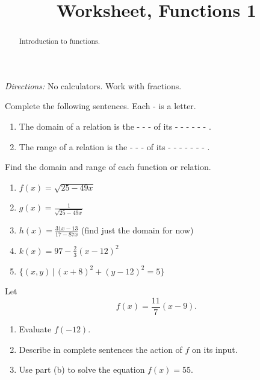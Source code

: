 \documentclass{ximera}
\title{Worksheet, Functions 1}
\begin{document}
\begin{abstract}
Introduction to functions.
\end{abstract}
\maketitle

\emph{Directions:} No calculators. Work with fractions.


\begin{question} \label{Qfvm334}
Complete the following sentences. Each - is a letter.

\begin{enumerate}
\item The domain of a relation is the  - - -  of its  - - - - - - .

\item The range of a relation is the - - - of its  - - - - - - - .
\end{enumerate}
\end{question}

\begin{question} \label{Q930f}
Find the domain and range of each function or relation.

\begin{enumerate}
\item $f(x) = \sqrt{25 - 49x}$

\item $g(x) = \frac{1}{\sqrt{25 - 49x}}$

\item $h(x) = \frac{31x - 13}{17 - 87x}$ (find just the domain for now)

\item $k(x) = 97 - \frac{2}{3}\left( x-12 \right)^2$

\item $\{ (x,y) \, | \, (x+8)^2 + (y-12)^2 = 5 \}$
\end{enumerate}
\end{question}

\begin{question} \label{Qor3or3}
Let 
\[
    f(x) = \frac{11}{7}\left( x - 9 \right) .
\]

\begin{enumerate}
\item Evaluate $f(-12)$.

\item Describe in complete sentences the action of $f$ on its input.

\item Use part (b) to solve the equation $f(x) = 55$.
\end{enumerate}
\end{question}
\end{document}
